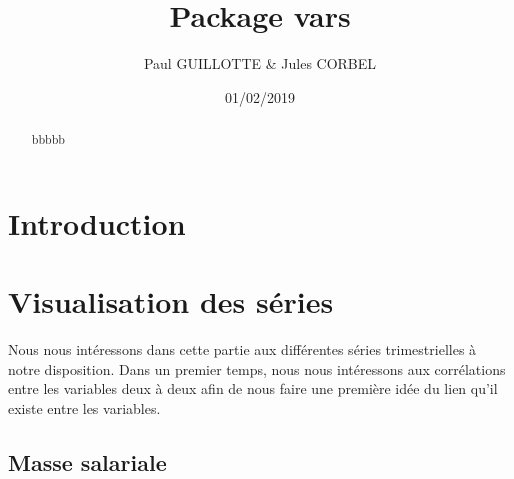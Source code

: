 \documentclass[11pt,]{article}
\title{Package vars}
\author{Paul GUILLOTTE \& Jules CORBEL}
\date{01/02/2019}
\newenvironment{Shaded}{\begin{snugshade}}{\end{snugshade}}
\newcommand{\KeywordTok}[1]{\textcolor[rgb]{0.13,0.29,0.53}{\textbf{{#1}}}}
\newcommand{\DataTypeTok}[1]{\textcolor[rgb]{0.13,0.29,0.53}{{#1}}}
\newcommand{\DecValTok}[1]{\textcolor[rgb]{0.00,0.00,0.81}{{#1}}}
\newcommand{\FloatTok}[1]{\textcolor[rgb]{0.00,0.00,0.81}{{#1}}}
\newcommand{\StringTok}[1]{\textcolor[rgb]{0.31,0.60,0.02}{{#1}}}
\newcommand{\NormalTok}[1]{{#1}}
\begin{document}
\maketitle
\begin{abstract}
bbbbb
\end{abstract}

{
\setcounter{tocdepth}{2}
\tableofcontents
}
\section*{Introduction}\label{introduction}

\section{Visualisation des séries}\label{visualisation-des-series}

Nous nous intéressons dans cette partie aux différentes séries
trimestrielles à notre disposition. Dans un premier temps, nous nous
intéressons aux corrélations entre les variables deux à deux afin de
nous faire une première idée du lien qu'il existe entre les variables.

\subsection{Masse salariale}\label{masse-salariale}

\begin{Shaded}
\end{Shaded}
\end{document}
